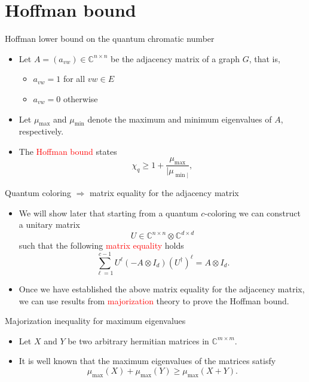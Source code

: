 \documentclass{beamer}
\newcommand{\C}{\mathbb{C}}
\renewcommand{\>}{\rangle}
\newcommand{\<}{\langle}
\begin{document}
%

\section{Hoffman bound}

\begin{frame}{Hoffman lower bound on the quantum chromatic number}

\begin{itemize}
\item Let $A=(a_{vw})\in\C^{n\times n}$ be the adjacency matrix of a graph $G$, that is, 

\begin{itemize}
\item $a_{vw}=1$ for all $vw\in E$ 
\item $a_{vw}=0$ otherwise
\end{itemize}

\item Let $\mu_{\max}$ and $\mu_{\min}$ denote the maximum and minimum eigenvalues of $A$, respectively.

\item The \textcolor{red}{Hoffman bound} states
\[
\chi_q \ge 1 + \frac{\mu_{\max}}{|\mu_{\min|}},
\]

\end{itemize}
\end{frame}

%

\begin{frame}{Quantum coloring $\Rightarrow$ matrix equality for the adjacency matrix}

\begin{itemize}
\item We will show later that starting from a quantum $c$-coloring we can construct a unitary matrix 
\[
U\in \C^{n\times n}\otimes\C^{d\times d}
\]
such that the following \textcolor{red}{matrix equality} holds
\[
\sum_{\ell=1}^{c-1} U^\ell (-A\otimes I_d) (U^\dagger)^\ell = A \otimes I_d.
\]

\item Once we have established the above matrix equality for the adjacency matrix, we can use results from \textcolor{red}{majorization} theory to prove the Hoffman bound.
\end{itemize}

\end{frame}

%

\begin{frame}{Majorization inequality for maximum eigenvalues}

\begin{itemize}
\item Let $X$ and $Y$ be two arbitrary hermitian matrices in $\C^{m\times m}$.

\item It is well known that the maximum eigenvalues of the matrices satisfy 
\[
\mu_{\max}(X) + \mu_{\max}(Y) \ge \mu_{\max}(X + Y).
\]
\end{itemize}
\end{frame}
\end{document}
